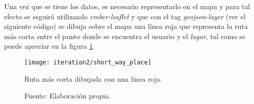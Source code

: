 %

Una vez que se tiene los datos, es necesario representarlo en el mapa y para tal efecto se seguirá utilizando \emph{ember-leaflet} y que con el tag \emph{geojson-layer} (ver el siguiente código) se dibuja sobre el mapa una línea roja que representa la ruta más corta entre el punto donde se encuentra el usuario y el \emph{lugar}, tal como se puede apreciar en la figura \ref{fig:short_way_place}.
%


\begin{figure}[H]
 \begin{center}
   \texttt{[image: iteration2/short\_way\_place]}
   \caption{Ruta más corta dibujada con una línea roja.}
   \label{fig:short_way_place}
   \caption*{Fuente: Elaboración propia.}
 \end{center}
\end{figure}



